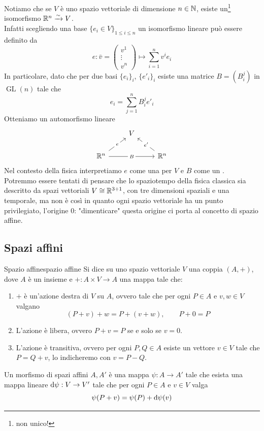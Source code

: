 \documentclass[openany]{book}
\newcommand\GL{\operatorname{GL}}
\begin{document}
Notiamo che se $V$ è uno spazio vettoriale di dimensione $n \in \mathbb{N}$, esiste un\footnote{non unico!} isomorfismo $\mathbb{R}^n \xrightarrow{\sim} V$.\\
Infatti scegliendo una base $\{e_i\in V\}_{1\le i \le n}$ un isomorfismo lineare può essere definito da 
\[ e: \bar{v} = \begin{pmatrix} v^1 \\ \vdots \\ v^n \end{pmatrix}\mapsto \sum_{i=1}^n v^i e_i  \]
In particolare, dato che per due basi $\{e_i\}_i$, $\{e'_i\}_i$ esiste una matrice $B = (B_i^j)$ in $\GL(n)$ tale che 
\[ e_i = \sum_{j = 1}^n B^j_i e'_i \]
Otteniamo un automorfismo lineare
\[\begin{tikzcd}
	& V & \\
	{\R^n} && {\R^n}
	\arrow["e"{description}, from=2-1, to=1-2]
	\arrow["B"{description}, from=2-1, to=2-3]
	\arrow["{e'}"{description}, from=2-3, to=1-2]
\end{tikzcd}\]
Nel contesto della fisica interpretiamo $e$ come una  per $V$ e $B$ come un .\\
Potremmo essere tentati di pensare che lo spaziotempo della fisica classica sia descritto da spazi vettoriali $V \cong \mathbb{R}^{3+1}$, con tre dimensioni spaziali e una temporale, ma non è così in quanto ogni spazio vettoriale ha un punto privilegiato, l'origine $0$: "dimenticare" questa origine ci porta al concetto di spazio affine.

\subsection{Spazi affini}

\begin{definition}{Spazio affine}{spazio affine}
    Si dice  su uno spazio vettoriale $V$ una coppia $(A,+)$, dove $A$ è un insieme e $+:A\times V\to A$ una mappa tale che:\begin{enumerate}
        \item $+$ è un'azione destra di $V$ su $A$, ovvero tale che per ogni $P\in A$ e $v,w\in V$ valgano \[ (P+v)+w = P+(v+w),\qquad P+0=P \]
        \item L'azione è libera, ovvero $P+v = P$ se e solo se $v=0$.
        \item L'azione è transitiva, ovvero per ogni $P,Q \in A$ esiste un vettore $v \in V$ tale che $P = Q+v$, lo indicheremo con $v = P-Q$.
    \end{enumerate}
    Un morfismo di spazi affini $A,A'$ è una mappa $\psi: A\to A'$ tale che esista una mappa lineare $\text{d}\psi : V\to V'$ tale che per ogni $P \in A$ e $v \in V$ valga 
    \[ \psi(P+v) = \psi(P)+\text{d}\psi(v) \]
\end{definition}
\end{document}
